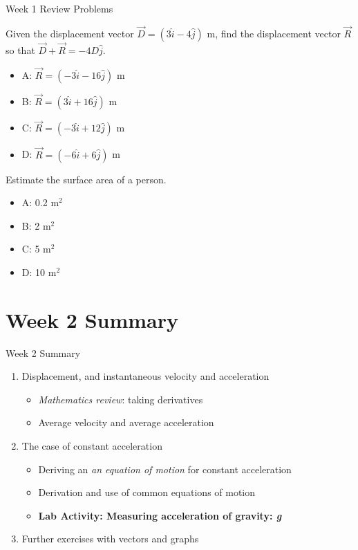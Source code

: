 \documentclass{beamer}
\begin{document}
\begin{frame}{Week 1 Review Problems}
\small
\begin{minipage}[b]{0.45\linewidth}
Given the displacement vector $\vec{D} = (3\hat{i}-4\hat{j})$ m, find the displacement vector $\vec{R}$ so that $\vec{D} + \vec{R} = -4D\hat{j}$.
\begin{itemize}
\item A: $\vec{R} =  (-3\hat{i}-16\hat{j})$ m
\item B: $\vec{R} =  (3\hat{i}+16\hat{j})$ m
\item C: $\vec{R} =  (-3\hat{i}+12\hat{j})$ m
\item D: $\vec{R} =  (-6\hat{i}+6\hat{j})$ m
\end{itemize}
\end{minipage}
\hspace{0.5cm}
\begin{minipage}[b]{0.45\linewidth}
Estimate the surface area of a person.
\vspace{1cm}
\begin{itemize}
\item A: 0.2 m$^2$
\item B: 2 m$^2$
\item C: 5 m$^2$
\item D: 10 m$^2$
\end{itemize}
\end{minipage}
\end{frame}

\section{Week 2 Summary}

\begin{frame}{Week 2 Summary}
\begin{enumerate}
\item Displacement, and instantaneous velocity and acceleration
\begin{itemize}
\item \textit{Mathematics review}: taking derivatives
\item Average velocity and average acceleration
\end{itemize}
\item The case of constant acceleration
\begin{itemize}
\item Deriving an \textit{an equation of motion} for constant acceleration
\item Derivation and use of \alert{common equations of motion}
\item \textbf{Lab Activity: Measuring acceleration of gravity: \textit{g}}
\end{itemize}
\item Further exercises with vectors and graphs
\end{enumerate}
\end{frame}
\end{document}
